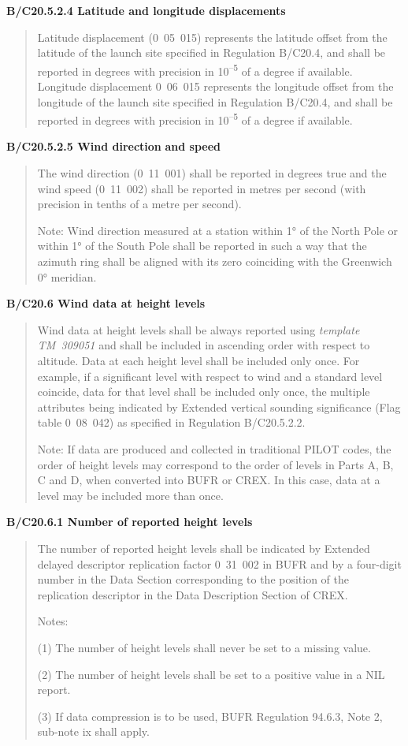 \textbf{B/C20.5.2.4 Latitude and longitude displacements}

\begin{quote}
Latitude displacement (0~05~015) represents the latitude offset from the latitude of the launch site specified in Regulation B/C20.4, and shall be reported in degrees with precision in 10\textsuperscript{--5} of a degree if available. Longitude displacement 0~06~015 represents the longitude offset from the longitude of the launch site specified in Regulation B/C20.4, and shall be reported in degrees with precision in 10\textsuperscript{--5} of a degree if available.
\end{quote}

\textbf{B/C20.5.2.5 Wind direction} \textbf{and speed}

\begin{quote}
The wind direction (0~11~001) shall be reported in degrees true and the wind speed (0~11~002) shall be reported in metres per second (with precision in tenths of a metre per second).

Note: Wind direction measured at a station within 1° of the North Pole or within 1° of the South Pole shall be reported in such a way that the azimuth ring shall be aligned with its zero coinciding with the Greenwich 0° meridian.
\end{quote}

\textbf{B/C20.6 Wind data at height levels}

\begin{quote}
Wind data at height levels shall be always reported using \emph{template TM~309051} and shall be included in ascending order with respect to altitude. Data at each height level shall be included only once. For example, if a significant level with respect to wind and a standard level coincide, data for that level shall be included only once, the multiple attributes being indicated by Extended vertical sounding significance (Flag table 0~08~042) as specified in Regulation B/C20.5.2.2.

Note: If data are produced and collected in traditional PILOT codes, the order of height levels may correspond to the order of levels in Parts A, B, C and D, when converted into BUFR or CREX. In this case, data at a level may be included more than once.
\end{quote}

\textbf{B/C20.6.1 Number of reported height levels}

\begin{quote}
The number of reported height levels shall be indicated by Extended delayed descriptor replication factor 0~31~002 in BUFR and by a four-digit number in the Data Section corresponding to the position of the replication descriptor in the Data Description Section of CREX.

Notes:

(1) The number of height levels shall never be set to a missing value.

(2) The number of height levels shall be set to a positive value in a NIL report.

(3) If data compression is to be used, BUFR Regulation 94.6.3, Note 2, sub-note ix shall apply.
\end{quote}

